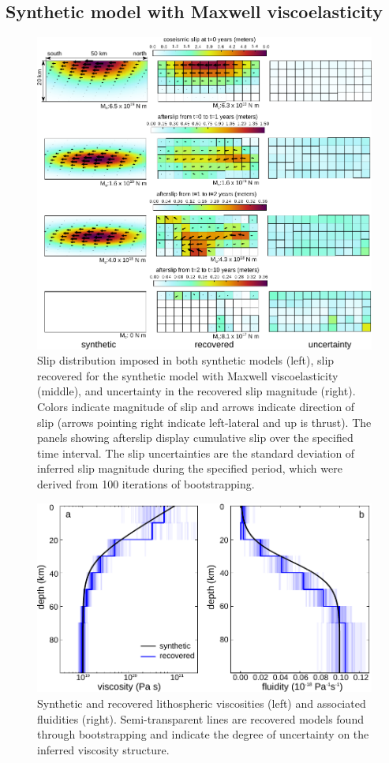 \subsection{Synthetic model with Maxwell viscoelasticity}\label{MaxModel}

\begin{figure}
\includegraphics{ch2/figures/Fig3.pdf}
\caption{Slip distribution imposed in both synthetic models (left),
slip recovered for the synthetic model with Maxwell viscoelasticity
(middle), and uncertainty in the recovered slip magnitude (right).
Colors indicate magnitude of slip and arrows indicate direction of
slip (arrows pointing right indicate left-lateral and up is thrust).
The panels showing afterslip display cumulative slip over the
specified time interval.  The slip uncertainties are the standard
deviation of inferred slip magnitude during the specified period,
which were derived from 100 iterations of bootstrapping.}
\label{figure3}
\end{figure}

\begin{figure}
\includegraphics{ch2/figures/Fig4.pdf}
\caption{Synthetic and recovered lithospheric viscosities (left) and
associated fluidities (right).  Semi-transparent lines are recovered
models found through bootstrapping and indicate the degree of
uncertainty on the inferred viscosity structure.}
\label{figure4}
\end{figure}

